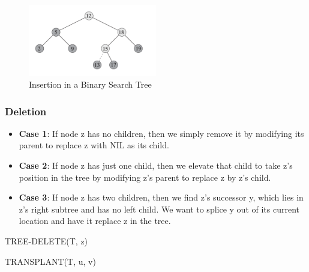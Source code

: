 \begin{figure}[H]
    \centering
    \includegraphics[width=0.5\textwidth]{assets/insertion_bt.png}
    \caption{Insertion in a Binary Search Tree}
\end{figure}

\subsubsection*{Deletion}

\begin{itemize}
    \item \textbf{Case 1}: If node z has no children, then we simply remove it by modifying its parent to replace z with NIL as its child.
    \item \textbf{Case 2}: If node z has just one child, then we elevate that child to take z’s position in the tree by modifying z’s parent to replace z by z’s child.
    \item \textbf{Case 3}: If node z has two children, then we find z’s successor y, which lies in z’s right subtree and has no left child. We want to splice y out of its current location and have it replace z in the tree.
\end{itemize}

\begin{algorithm}
    \caption{TREE-DELETE(T, z)}
\end{algorithm}

\begin{algorithm}
    \caption{TRANSPLANT(T, u, v)}
\end{algorithm}

